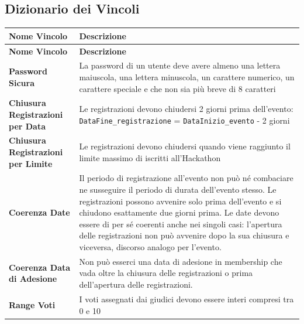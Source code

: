 \documentclass[a4paper, 10pt]{article}
\renewcommand{\arraystretch}{1.2} %
\begin{document}
	\subsection{Dizionario dei Vincoli}
	{\footnotesize
		\setlength{\arrayrulewidth}{0.5pt}
		\renewcommand{\arraystretch}{2.5}
		\begin{longtable}{
				>{\raggedright\arraybackslash}p{5.5cm}
				>{\raggedright\arraybackslash}p{10cm}
			}
			\hline
			\textbf{Nome Vincolo} & \textbf{Descrizione} \\
			\hline
			\endfirsthead
			\hline
			\textbf{Nome Vincolo} & \textbf{Descrizione} \\
			\hline
			\endhead
			\hline
			\endfoot
			\hline
			\endlastfoot
			
			\textbf{Password Sicura} &
			La password di un utente deve avere almeno una lettera maiuscola, una lettera minuscola, un carattere numerico, un carattere speciale e che non sia più breve di 8 caratteri \\
			\hline
			
			\textbf{Chiusura Registrazioni per Data} &
			Le registrazioni devono chiudersi 2 giorni prima dell'evento:
			\texttt{DataFine\_registrazione} = \texttt{DataInizio\_evento} - 2 giorni \\
			\hline
			
			\textbf{Chiusura Registrazioni per Limite} &
			Le registrazioni devono chiudersi quando viene raggiunto il limite massimo di iscritti all'Hackathon \\
			\hline
			
			\textbf{Coerenza Date} &
			Il periodo di registrazione all'evento non può né combaciare ne susseguire il periodo di durata dell'evento stesso.
			Le registrazioni possono avvenire solo prima dell'evento e si chiudono esattamente due giorni prima.
			Le date devono essere di per sé coerenti anche nei singoli casi: l'apertura delle registrazioni non può avvenire dopo
			la sua chiusura e viceversa, discorso analogo per l'evento.\\
			\hline
			
			\textbf{Coerenza Data di Adesione} &
			Non può esserci una data di adesione in membership che vada oltre la chiusura delle registrazioni o prima dell'apertura delle registrazioni.\\
			\hline
			
			\textbf{Range Voti} &
			I voti assegnati dai giudici devono essere interi compresi tra 0 e 10\\
			\hline
			

\end{longtable}}
\end{document}
